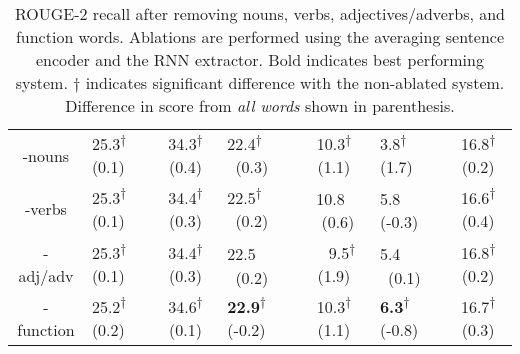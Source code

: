 \begin{table*}[ht]
\begin{tabular}{cgcgcgc}
    -nouns & 25.3\textsuperscript{$\dagger$} \footnotesize{(0.1)}& 34.3\textsuperscript{$\dagger$} \footnotesize{(0.4)}& 22.4\textsuperscript{$\dagger$} ~\footnotesize{(0.3)}& 10.3\textsuperscript{$\dagger$} \footnotesize{(1.1)} & 3.8\textsuperscript{$\dagger$} \footnotesize{(1.7)}& 16.8\textsuperscript{$\dagger$} \footnotesize{(0.2)}\\
    -verbs & 25.3\textsuperscript{$\dagger$} \footnotesize{(0.1)}& 34.4\textsuperscript{$\dagger$} \footnotesize{(0.3)} & 22.5\textsuperscript{$\dagger$} ~\footnotesize{(0.2)}& 10.8\textsuperscript{~} ~\footnotesize{(0.6)} & 5.8\textsuperscript{~} \footnotesize{(-0.3)} & 16.6\textsuperscript{$\dagger$} \footnotesize{(0.4)}\\
    -adj/adv & 25.3\textsuperscript{$\dagger$} \footnotesize{(0.1)}& 34.4\textsuperscript{$\dagger$} \footnotesize{(0.3)} & 22.5\textsuperscript{~} ~\footnotesize{(0.2)} & ~~9.5\textsuperscript{$\dagger$} \footnotesize{(1.9)} & 5.4\textsuperscript{~} ~\footnotesize{(0.1)} & 16.8\textsuperscript{$\dagger$} \footnotesize{(0.2)}\\
    -function & 25.2\textsuperscript{$\dagger$} \footnotesize{(0.2)} & 34.6\textsuperscript{$\dagger$} \footnotesize{(0.1)} & \textbf{22.9}\textsuperscript{$\dagger$} \footnotesize{(-0.2)} & 10.3\textsuperscript{$\dagger$} \footnotesize{(1.1)}& \textbf{6.3}\textsuperscript{$\dagger$} \footnotesize{(-0.8)}& 16.7\textsuperscript{$\dagger$} \footnotesize{(0.3)}\\
    \bottomrule
\end{tabular}



\caption{ROUGE-2 recall after removing nouns, verbs, adjectives/adverbs, and 
    function words. Ablations are
    performed using the averaging sentence encoder and the RNN
extractor. 
Bold indicates best performing system. $\dagger$ indicates significant 
difference with the non-ablated system. Difference in score from \textit{all words} shown in parenthesis.}
\label{tab:ablations}
\end{table*}

